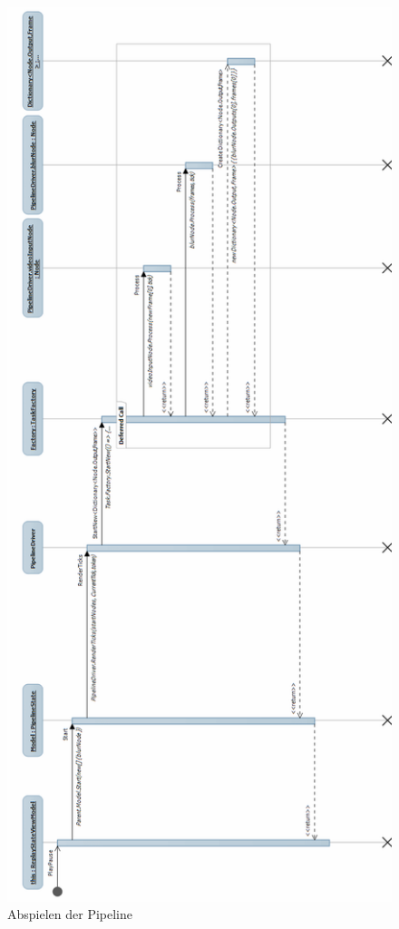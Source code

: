 \begin{figure}[h!]
\begin{center}
\includegraphics[height=0.9\textheight]{Diagrams/play.png}
\end{center}
\caption{Abspielen der Pipeline}
\end{figure}